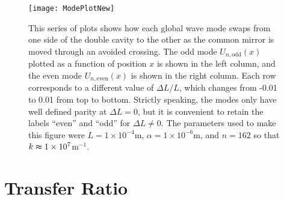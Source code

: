 \documentclass[twocolumn,english,pra,aps,superscriptaddress,floatfix]{revtex4-1}
\begin{document}
\begin{figure}
\texttt{[image: ModePlotNew]}
\caption{This series of plots shows how each global wave mode swaps from one side of the double cavity to the other as the common mirror is moved through an avoided crossing. The odd mode $U_{n,\mathrm{odd}}(x)$ plotted as a function of position $x$ is shown in the left column, and the even mode $U_{n,\mathrm{even}}(x)$ is shown in the right column. Each row corresponds to a different value of  $\Delta L / L$, which changes from -0.01 to 0.01 from top to bottom.  Strictly speaking, the modes only have well defined parity at $\Delta L=0$, but it is convenient to retain the labels ``even'' and ``odd'' for $\Delta L \neq 0$. The parameters used to make this figure were $L=1 \times 10^{-4}$m, $\alpha=1\times 10^{-6}$m, and $n=162$ so that
$k \thickapprox 1 \times 10^7$m$^{-1}$.}
\label{fig:ModePlotNew}
\end{figure}

\section{Transfer Ratio}
\label{sec:transferratio}
\end{document}
